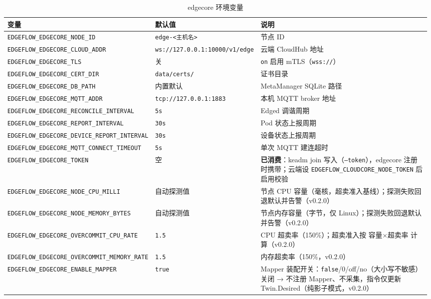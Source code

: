 \begin{table}[htbp]
\centering
\caption{edgecore 环境变量}
\label{tab:a-edge}
\begin{tabularx}{\textwidth}{l l X}
\toprule
\textbf{变量} & \textbf{默认值} & \textbf{说明} \\
\midrule
\texttt{EDGEFLOW\_EDGECORE\_NODE\_ID} & \texttt{edge-\allowbreak<主机名>} & 节点 ID \\
\texttt{EDGEFLOW\_EDGECORE\_CLOUD\_ADDR} & \texttt{ws://127.0.0.1:10000/v1/edge} & 云端 CloudHub 地址 \\
\texttt{EDGEFLOW\_EDGECORE\_TLS} & 关 & \texttt{on} 启用 mTLS（\texttt{wss://}） \\
\texttt{EDGEFLOW\_EDGECORE\_CERT\_DIR} & \texttt{data/certs/} & 证书目录 \\
\texttt{EDGEFLOW\_EDGECORE\_DB\_PATH} & 内置默认 & MetaManager SQLite 路径 \\
\texttt{EDGEFLOW\_EDGECORE\_MQTT\_ADDR} & \texttt{tcp://127.0.0.1:1883} & 本机 MQTT broker 地址 \\
\texttt{EDGEFLOW\_EDGECORE\_RECONCILE\_INTERVAL} & \texttt{5s} & Edged 调谐周期 \\
\texttt{EDGEFLOW\_EDGECORE\_REPORT\_INTERVAL} & \texttt{30s} & Pod 状态上报周期 \\
\texttt{EDGEFLOW\_EDGECORE\_DEVICE\_REPORT\_INTERVAL} & \texttt{30s} & 设备状态上报周期 \\
\texttt{EDGEFLOW\_EDGECORE\_MQTT\_CONNECT\_TIMEOUT} & \texttt{5s} & 单次 MQTT 建连超时 \\
\texttt{EDGEFLOW\_EDGECORE\_TOKEN} & 空 & \textbf{已消费}：keadm join 写入（\texttt{--token}），edgecore 注册时携带；云端设 \texttt{EDGEFLOW\_CLOUDCORE\_NODE\_TOKEN} 后启用校验 \\
\texttt{EDGEFLOW\_EDGECORE\_NODE\_CPU\_MILLI} & 自动探测值 & 节点 CPU 容量（毫核，超卖准入基线）；探测失败回退默认并告警（v0.2.0） \\
\texttt{EDGEFLOW\_EDGECORE\_NODE\_MEMORY\_BYTES} & 自动探测值 & 节点内存容量（字节，仅 Linux）；探测失败回退默认并告警（v0.2.0） \\
\texttt{EDGEFLOW\_EDGECORE\_OVERCOMMIT\_CPU\_RATE} & \texttt{1.5} & CPU 超卖率（150\%）；超卖准入按 容量×超卖率 计算（v0.2.0） \\
\texttt{EDGEFLOW\_EDGECORE\_OVERCOMMIT\_MEMORY\_RATE} & \texttt{1.5} & 内存超卖率（150\%，v0.2.0） \\
\texttt{EDGEFLOW\_EDGECORE\_ENABLE\_MAPPER} & \texttt{true} & Mapper 装配开关：\texttt{false}/0/off/no（大小写不敏感）关闭 → 不注册 Mapper、不采集，指令仅更新 Twin.Desired（纯影子模式，v0.2.0） \\
\bottomrule
\end{tabularx}
\end{table}

